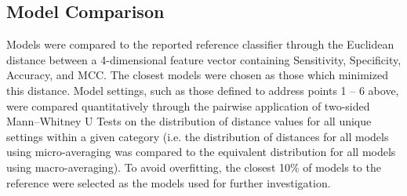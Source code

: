\subsection{Model Comparison}
Models were compared to the reported reference classifier through the Euclidean distance between a 4-dimensional
feature vector containing Sensitivity, Specificity, Accuracy, and MCC. The closest models were chosen as those which
minimized this distance. Model settings, such as those defined to address points 1 -- 6 above, were compared
quantitatively through the pairwise application of two-sided Mann–Whitney U Tests on the distribution of distance
values for all unique settings within a given category (i.e. the distribution of distances for all models using
micro-averaging was compared to the equivalent distribution for all models using macro-averaging). To avoid
overfitting, the closest 10\% of models to the reference were selected as the models used for further investigation.
